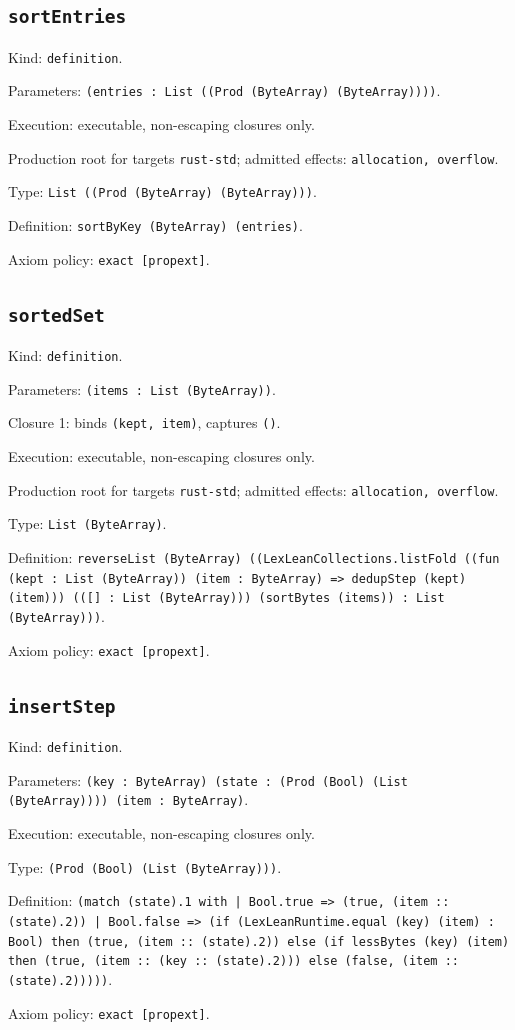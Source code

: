 \documentclass[11pt]{article}
\begin{document}
\subsection*{\texttt{sortEntries}}
\noindent Kind: \texttt{definition}.\par
\noindent Parameters: \texttt{(entries : List ((Prod (ByteArray) (ByteArray))))}.\par
\noindent Execution: executable, non-escaping closures only.\par
\noindent Production root for targets \texttt{rust-std}; admitted effects: \texttt{allocation, overflow}.\par
\noindent Type: \texttt{List ((Prod (ByteArray) (ByteArray)))}.\par
\noindent Definition: \texttt{sortByKey (ByteArray) (entries)}.\par
\noindent Axiom policy: \texttt{exact [propext]}.\par
\subsection*{\texttt{sortedSet}}
\noindent Kind: \texttt{definition}.\par
\noindent Parameters: \texttt{(items : List (ByteArray))}.\par
\noindent Closure 1: binds \texttt{(kept, item)}, captures \texttt{()}.\par
\noindent Execution: executable, non-escaping closures only.\par
\noindent Production root for targets \texttt{rust-std}; admitted effects: \texttt{allocation, overflow}.\par
\noindent Type: \texttt{List (ByteArray)}.\par
\noindent Definition: \texttt{reverseList (ByteArray) ((LexLeanCollections.listFold ((fun (kept : List (ByteArray)) (item : ByteArray) => dedupStep (kept) (item))) (([] : List (ByteArray))) (sortBytes (items)) : List (ByteArray)))}.\par
\noindent Axiom policy: \texttt{exact [propext]}.\par
\subsection*{\texttt{insertStep}}
\noindent Kind: \texttt{definition}.\par
\noindent Parameters: \texttt{(key : ByteArray) (state : (Prod (Bool) (List (ByteArray)))) (item : ByteArray)}.\par
\noindent Execution: executable, non-escaping closures only.\par
\noindent Type: \texttt{(Prod (Bool) (List (ByteArray)))}.\par
\noindent Definition: \texttt{(match (state).1 with | Bool.true => (true, (item :: (state).2)) | Bool.false => (if (LexLeanRuntime.equal (key) (item) : Bool) then (true, (item :: (state).2)) else (if lessBytes (key) (item) then (true, (item :: (key :: (state).2))) else (false, (item :: (state).2)))))}.\par
\noindent Axiom policy: \texttt{exact [propext]}.\par
\end{document}
